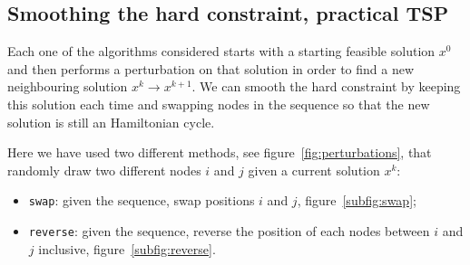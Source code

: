 \subsection{Smoothing the hard constraint, practical TSP}\label{subsc:practical}

Each one of the algorithms considered starts with a starting feasible solution $x^0$ and then performs a perturbation on that solution in order to find a new neighbouring solution $x^k\rightarrow x^{k+1}$. We can smooth the hard constraint by keeping this solution each time and swapping nodes in the sequence so that the new solution is still an Hamiltonian cycle.

Here we have used two different methods, see figure~\vref{fig:perturbations}, that randomly draw two different nodes $i$ and $j$ given a current solution $x^k$:
\begin{itemize}
	\item \texttt{swap}: given the sequence, swap positions $i$ and $j$, figure~\ref{subfig:swap};
	\item \texttt{reverse}: given the sequence, reverse the position of each nodes between $i$ and $j$ inclusive, figure~\ref{subfig:reverse}.
\end{itemize}


